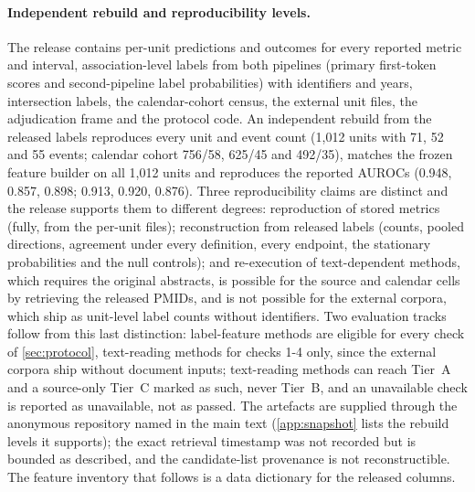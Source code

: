 \documentclass[11pt]{article}
\begin{document}
\paragraph{Independent rebuild and reproducibility levels.} The release contains per-unit predictions and outcomes for every reported metric and interval, association-level labels from both pipelines (primary first-token scores and second-pipeline label probabilities) with identifiers and years, intersection labels, the calendar-cohort census, the external unit files, the adjudication frame and the protocol code. An independent rebuild from the released labels reproduces every unit and event count (1{,}012 units with 71, 52 and 55 events; calendar cohort 756/58, 625/45 and 492/35), matches the frozen feature builder on all 1{,}012 units and reproduces the reported AUROCs (0.948, 0.857, 0.898; 0.913, 0.920, 0.876). Three reproducibility claims are distinct and the release supports them to different degrees: reproduction of stored metrics (fully, from the per-unit files); reconstruction from released labels (counts, pooled directions, agreement under every definition, every endpoint, the stationary probabilities and the null controls); and re-execution of text-dependent methods, which requires the original abstracts, is possible for the source and calendar cells by retrieving the released PMIDs, and is not possible for the external corpora, which ship as unit-level label counts without identifiers. Two evaluation tracks follow from this last distinction: label-feature methods are eligible for every check of \cref{sec:protocol}, text-reading methods for checks 1-4 only, since the external corpora ship without document inputs; text-reading methods can reach Tier~A and a source-only Tier~C marked as such, never Tier~B, and an unavailable check is reported as unavailable, not as passed. The artefacts are supplied through the anonymous repository named in the main text
(\cref{app:snapshot} lists the rebuild levels it supports); the exact retrieval timestamp was not recorded but is bounded as described, and the candidate-list provenance is not reconstructible. The feature inventory that follows is a data dictionary for
the released columns.
\end{document}
